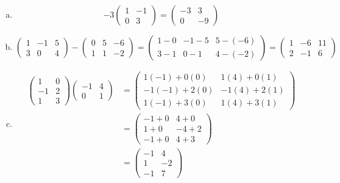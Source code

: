\documentclass[11pt,letterpaper]{article}
\begin{document}
\sol
\begin{enumerate}[(a)]
\item 
	\[
	-3 \begin{pmatrix} 1 & -1 \\ 0 & 3 \end{pmatrix}= \begin{pmatrix} -3 & 3 \\ 0 & -9 \end{pmatrix}
	\] \pspace

\item 
	\[
	\begin{pmatrix} 1 & -1 & 5 \\ 3 & 0 & 4 \end{pmatrix} - \begin{pmatrix} 0 & 5 & -6 \\ 1 & 1 & -2 \end{pmatrix}= \begin{pmatrix} 1 - 0 & -1 - 5 & 5 - (-6) \\ 3 - 1 & 0 - 1 & 4 - (-2) \end{pmatrix}= \begin{pmatrix} 1 & -6 & 11 \\ 2 & -1 & 6 \end{pmatrix}
	\] \pspace

\item 
	\[
	\begin{aligned}
	\begin{pmatrix} 1 & 0 \\ -1 & 2 \\ 1 & 3 \end{pmatrix} \begin{pmatrix} -1 & 4 \\ 0 & 1 \end{pmatrix}&= \begin{pmatrix}
	1(-1) + 0(0) & 1(4) + 0(1) \\
	-1(-1) + 2(0) & -1(4) + 2(1) \\
	1(-1) + 3(0) & 1(4) + 3(1)
	\end{pmatrix} \\[0.3cm]
	&= \begin{pmatrix}
	-1 + 0 & 4 + 0 \\
	1 + 0 & -4 + 2 \\
	-1 + 0 & 4 + 3 
	\end{pmatrix} \\[0.3cm]
	&= \begin{pmatrix}
	-1 & 4 \\
	1 & -2 \\
	-1 & 7
	\end{pmatrix}
	\end{aligned}
	\]
\end{enumerate}
\end{document}
